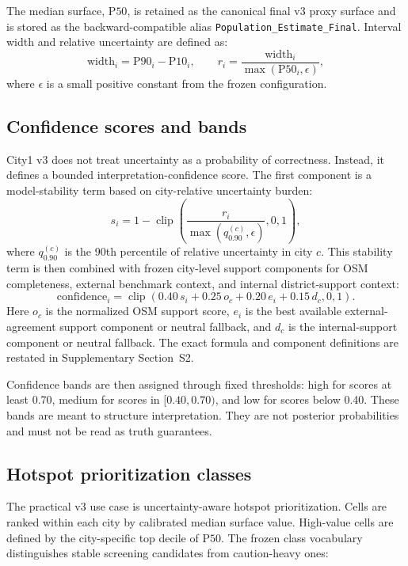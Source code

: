 The median surface, $\mathrm{P50}$, is retained as the canonical final v3 proxy surface and is stored as the backward-compatible alias \texttt{Population\_Estimate\_Final}. Interval width and relative uncertainty are defined as:
\[
\mathrm{width}_i = \mathrm{P90}_i - \mathrm{P10}_i,
\qquad
r_i = \frac{\mathrm{width}_i}{\max(\mathrm{P50}_i,\epsilon)},
\]
where $\epsilon$ is a small positive constant from the frozen configuration.

\subsection{Confidence scores and bands}

City1 v3 does not treat uncertainty as a probability of correctness. Instead, it defines a bounded interpretation-confidence score. The first component is a model-stability term based on city-relative uncertainty burden:
\[
s_i = 1 - \operatorname{clip}\!\left(
\frac{r_i}{\max(q_{0.90}^{(c)},\epsilon)}, 0, 1
\right),
\]
where $q_{0.90}^{(c)}$ is the 90th percentile of relative uncertainty in city $c$. This stability term is then combined with frozen city-level support components for OSM completeness, external benchmark context, and internal district-support context:
\[
\mathrm{confidence}_i =
\operatorname{clip}\!\left(
0.40\,s_i +
0.25\,o_c +
0.20\,e_i +
0.15\,d_c, 0, 1
\right).
\]
Here $o_c$ is the normalized OSM support score, $e_i$ is the best available external-agreement support component or neutral fallback, and $d_c$ is the internal-support component or neutral fallback. The exact formula and component definitions are restated in Supplementary Section~S2.

Confidence bands are then assigned through fixed thresholds: high for scores at least 0.70, medium for scores in $[0.40,0.70)$, and low for scores below 0.40. These bands are meant to structure interpretation. They are not posterior probabilities and must not be read as truth guarantees.

\subsection{Hotspot prioritization classes}

The practical v3 use case is uncertainty-aware hotspot prioritization. Cells are ranked within each city by calibrated median surface value. High-value cells are defined by the city-specific top decile of $\mathrm{P50}$. The frozen class vocabulary distinguishes stable screening candidates from caution-heavy ones:

